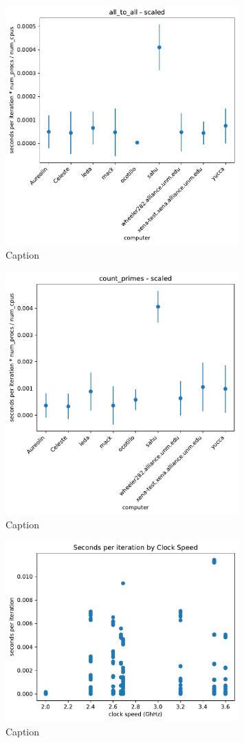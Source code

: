 \documentclass{article}
\begin{document}
\begin{figure}[h]
    \centering
    \includegraphics[width=0.8\textwidth]{figures/draft/all_to_all_scaled.pdf}
    \caption{Caption}
    \label{fig:all_to_all_scaled}
\end{figure}

\begin{figure}[h]
    \centering
    \includegraphics[width=0.8\textwidth]{figures/draft/count_primes_scaled.pdf}
    \caption{Caption}
    \label{fig:count_primes_scaled}
\end{figure}

\begin{figure}[h]
    \centering
    \includegraphics[width=0.8\textwidth]{figures/draft/correlation.pdf}
    \caption{Caption}
    \label{fig:correlation}
\end{figure}
\end{document}
